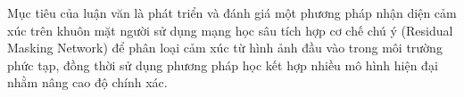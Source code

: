 Mục tiêu của luận văn là phát triển và đánh giá một phương pháp nhận diện cảm xúc trên khuôn mặt người sử dụng mạng học sâu tích hợp cơ chế chú ý (Residual Masking Network) để phân loại cảm xúc từ hình ảnh đầu vào trong môi trường phức tạp, đồng thời sử dụng phương pháp học kết hợp nhiều mô hình hiện đại nhằm nâng cao độ chính xác.